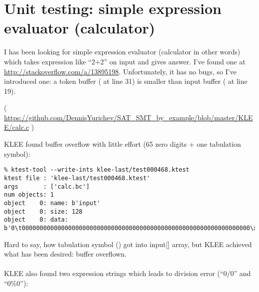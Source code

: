 \section{Unit testing: simple expression evaluator (calculator)}

I has been looking for simple expression evaluator (calculator in other words) which takes expression like ``2+2'' on input and gives answer.
I've found one at \url{http://stackoverflow.com/a/13895198}.
Unfortunately, it has no bugs, so I've introduced one: a token buffer ( at line 31) is smaller than input buffer ( at line 19).


( \url{https://github.com/DennisYurichev/SAT_SMT_by_example/blob/master/KLEE/calc.c} )

KLEE found buffer overflow with little effort (65 zero digits + one tabulation symbol):

\begin{lstlisting}
% ktest-tool --write-ints klee-last/test000468.ktest
ktest file : 'klee-last/test000468.ktest'
args       : ['calc.bc']
num objects: 1
object    0: name: b'input'
object    0: size: 128
object    0: data: b'0\t0000000000000000000000000000000000000000000000000000000000000000\xff\xff\xff\xff\xff\xff\xff\xff\xff\xff\xff\xff\xff\xff\xff\xff\xff\xff\xff\xff\xff\xff\xff\xff\xff\xff\xff\xff\xff\xff\xff\xff\xff\xff\xff\xff\xff\xff\xff\xff\xff\xff\xff\xff\xff\xff\xff\xff\xff\xff\xff\xff\xff\xff\xff\xff\xff\xff\xff\xff\xff\xff'
\end{lstlisting}

Hard to say, how tabulation symbol () got into input[] array, but KLEE achieved what has been desired: buffer overflown.\\
\\
KLEE also found two expression strings which leads to division error (``0/0'' and ``0\%0''):

